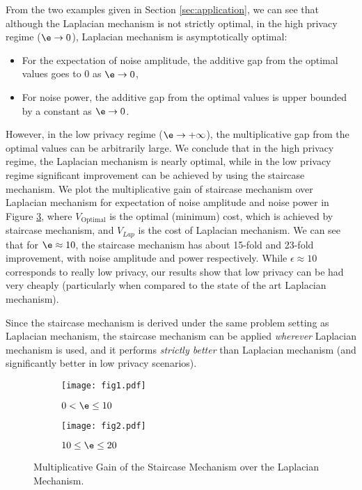From the two examples given in Section \ref{sec:application}, we can see that although the Laplacian mechanism is not strictly optimal, in the high privacy regime ($\e \to 0$), Laplacian mechanism is asymptotically optimal:
\begin{itemize}
	\item For the expectation of noise amplitude, the additive gap from the optimal values goes to 0 as $\e \to 0$,
	\item For noise power, the additive gap from the optimal values is upper bounded by a constant  as $\e \to 0$.
\end{itemize}
 However, in the low privacy regime ($\e \to +\infty$), the multiplicative gap from the optimal values can be arbitrarily large. We conclude that in the high privacy regime, the Laplacian mechanism is nearly optimal, while in the low privacy regime significant improvement can be achieved by using the staircase mechanism. We plot the multiplicative gain of staircase mechanism over Laplacian mechanism for expectation of noise amplitude and noise power in Figure  \ref{fig:comparison}, where $V_{\text{Optimal}}$ is the optimal (minimum) cost, which is achieved by staircase mechanism, and $V_{Lap}$ is the cost of Laplacian mechanism. We can see that for $\e \approx 10$, the staircase mechanism has about 15-fold and 23-fold improvement, with noise amplitude and power respectively. While $\epsilon \approx 10$ corresponds to really low privacy, our results show that low privacy can be had very cheaply (particularly when compared to the state of the art Laplacian mechanism).


Since the staircase mechanism is derived under the same problem setting as Laplacian mechanism, the staircase mechanism can be applied {\em wherever} Laplacian mechanism is used, and it performs {\em strictly better} than Laplacian mechanism (and significantly better in low privacy scenarios).



\begin{figure}[h]
\begin{subfigure}[b]{0.5\linewidth}
\centering
\texttt{[image: fig1.pdf]}
\caption{ $0 < \e \le 10 $}
\label{fig:compare1}
\end{subfigure}
\begin{subfigure}[b]{0.5\linewidth}
\centering
\texttt{[image: fig2.pdf]}
\caption{ $10 \le \e \le 20$}
\label{fig:compare2}
\end{subfigure}
\caption{Multiplicative Gain of the Staircase Mechanism over the Laplacian Mechanism. }
\label{fig:comparison}
\end{figure}


